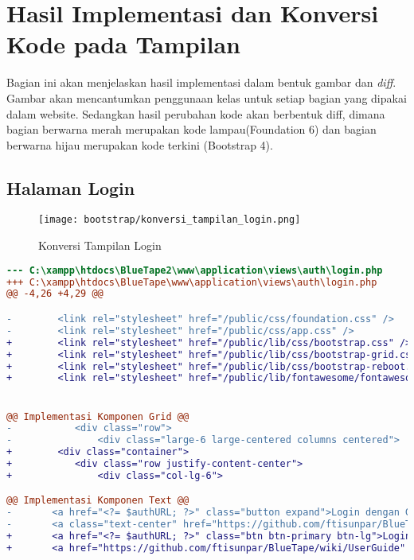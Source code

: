 \section{Hasil Implementasi dan Konversi Kode pada Tampilan}
Bagian ini akan menjelaskan hasil implementasi dalam bentuk gambar dan \textit{diff}. Gambar akan mencantumkan penggunaan kelas untuk setiap bagian yang dipakai dalam website. Sedangkan hasil perubahan kode akan berbentuk diff, dimana bagian berwarna merah merupakan kode lampau(Foundation 6) dan bagian berwarna hijau merupakan kode terkini  (Bootstrap 4).   
\subsection{Halaman Login}
\begin{figure} [H]
	\centering  
	\texttt{[image: bootstrap/konversi\_tampilan\_login.png]}  
	\caption{Konversi Tampilan Login} 
\end{figure}
\begin{lstlisting}[language=diff, caption=Kode untuk Halaman Login, label=Entri, basicstyle=\ttfamily, frame=single,
columns=fullflexible, keepspaces=true, breaklines=true]
--- C:\xampp\htdocs\BlueTape2\www\application\views\auth\login.php	
+++ C:\xampp\htdocs\BlueTape\www\application\views\auth\login.php	
@@ -4,26 +4,29 @@

-        <link rel="stylesheet" href="/public/css/foundation.css" />
-        <link rel="stylesheet" href="/public/css/app.css" />
+        <link rel="stylesheet" href="/public/lib/css/bootstrap.css" />
+        <link rel="stylesheet" href="/public/lib/css/bootstrap-grid.css" />
+        <link rel="stylesheet" href="/public/lib/css/bootstrap-reboot.css" />
+        <link rel="stylesheet" href="/public/lib/fontawesome/fontawesome.css" />


@@ Implementasi Komponen Grid @@
-        	<div class="row">
-        		<div class="large-6 large-centered columns centered">
+        <div class="container">
+        	<div class="row justify-content-center">
+        		<div class="col-lg-6">

@@ Implementasi Komponen Text @@
- 		<a href="<?= $authURL; ?>" class="button expand">Login dengan Google</a><br/><br/>
- 		<a class="text-center" href="https://github.com/ftisunpar/BlueTape/wiki/UserGuide" target="_blank">Petunjuk Penggunaan</a>
+ 		<a href="<?= $authURL; ?>" class="btn btn-primary btn-lg">Login dengan Google</a><br/><br/>
+ 		<a href="https://github.com/ftisunpar/BlueTape/wiki/UserGuide" target="_blank">Petunjuk Penggunaan</a>
\end{lstlisting}

